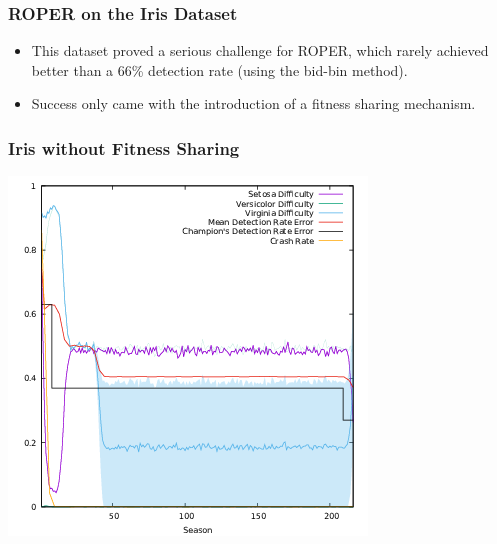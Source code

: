 \documentclass[11pt]{article}
\begin{document}
\subsubsection*{ROPER on the Iris Dataset}
\label{sec:org2b1fb00}
\begin{itemize}
\item This dataset proved a serious challenge for ROPER, which rarely achieved better than a 66\% detection rate (using the bid-bin method).
\item Success only came with the introduction of a fitness sharing mechanism.
\end{itemize}

\subsubsection*{Iris without Fitness Sharing}
\label{sec:orga49eb9b}
\begin{center}
\includegraphics[width=.9\linewidth]{./img/nosharing.png}
\end{center}
\end{document}
